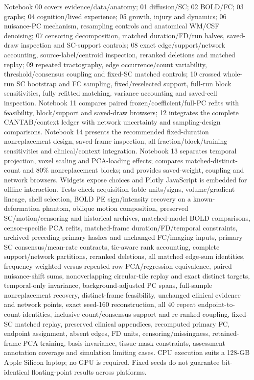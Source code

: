 \documentclass[11pt,a4paper]{article}
\begin{document}
Notebook 00 covers evidence/data/anatomy; 01 diffusion/SC; 02 BOLD/FC; 03 graphs; 04 cognition/lived experience; 05 growth, injury and dynamics; 06 nuisance-PC mechanism, resampling controls and anatomical WM/CSF denoising; 07 censoring decomposition, matched duration/FD/run halves, saved-draw inspection and SC-support controls; 08 exact edge/support/network accounting, source-label/centroid inspection, reranked deletions and matched replay; 09 repeated tractography, edge occurrence/count variability, threshold/consensus coupling and fixed-SC matched controls; 10 crossed whole-run SC bootstrap and FC sampling, fixed/reselected support, full-run block sensitivities, fully refitted matching, variance accounting and saved-cell inspection. Notebook 11 compares paired frozen/coefficient/full-PC refits with feasibility, block/support and saved-draw browsers; 12 integrates the complete CANTAB/context ledger with network uncertainty and sampling-design comparisons. Notebook 14 presents the recommended fixed-duration nonreplacement design, saved-frame inspection, all fraction/block/training sensitivities and clinical/context integration. Notebook 13 separates temporal projection, voxel scaling and PCA-loading effects; compares matched-distinct-count and 80\% nonreplacement blocks; and provides saved-weight, coupling and network browsers. Widgets expose choices and Plotly JavaScript is embedded for offline interaction. Tests check acquisition-table units/signs, volume/gradient lineage, shell selection, BOLD PE sign/intensity recovery on a known-deformation phantom, oblique motion composition, preserved SC/motion/censoring and historical archives, matched-model BOLD comparisons, censor-specific PCA refits, matched-frame duration/FD/temporal constraints, archived preceding-primary hashes and unchanged FC/imaging inputs, primary SC consensus/mean-rate contracts, tie-aware rank accounting, complete support/network partitions, reranked deletions, all matched edge-sum identities, frequency-weighted versus repeated-row PCA/regression equivalence, paired nuisance-shift sums, nonoverlapping circular-tile replay and exact distinct targets, temporal-only invariance, background-adjusted PC spans, full-sample nonreplacement recovery, distinct-frame feasibility, unchanged clinical evidence and network points, exact seed-160 reconstruction, all 40 repeat endpoint-to-count identities, inclusive count/consensus support and re-ranked coupling, fixed-SC matched replay, preserved clinical appendices, recomputed primary FC, endpoint assignment, absent edges, FD units, censoring/missingness, retained-frame PCA training, basis invariance, tissue-mask constraints, assessment annotation coverage and simulation limiting cases. CPU execution suits a 128-GB Apple Silicon laptop; no GPU is required. Fixed seeds do not guarantee bit-identical floating-point results across platforms.
\end{document}
